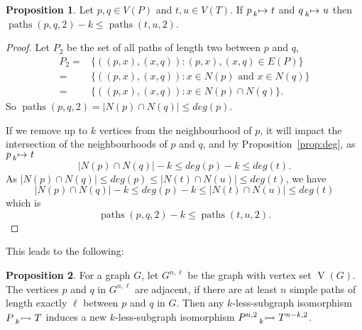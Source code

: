 \documentclass[letterpaper]{article}
\theoremstyle{definition}
\newtheorem{proposition}{Proposition}
\newcommand{\paths}{\operatorname{paths}}
\newcommand{\lessnonind}[1]{\prescript{}{#1}{\rightarrowtail}\ }
\newcommand{\lessmap}[1]{\prescript{}{#1}{\mapsto}\ }
\begin{document}
\begin{proposition}
    Let $p,q \in V(P)$ and $t,u\in V(T)$. If $p \lessmap{k} t$ and $q \lessmap{k} u$ then
     $\paths(p, q, 2) - k \le \paths(t, u, 2)$.
\end{proposition}
\begin{proof}
Let $P_{2}$ be the set of all paths of length two between $p$ and $q$,
\begin{align*}
P_{2} = & \{((p,x),(x,q)) : (p,x),(x,q)\in E(P) \} \\
 = & \{((p,x),(x,q)) : x\in N(p) \text{ and } x\in N(q) \} \\
 = & \{((p,x),(x,q)) : x\in N(p)\cap N(q) \} .
\end{align*}
So $\paths(p,q,2) = | N(p)\cap N(q)| \leq deg(p)$.

If we remove up to $k$ vertices from the neighbourhood of $p$, it will impact the intersection of the neighbourhoods of $p$ and $q$, and by Proposition~\ref{prop:deg}, as $p\lessmap{k}t$
\[
|N(p)\cap N(q)| - k \leq deg(p) - k \leq deg(t).
\]
As $|N(p)\cap N(q)|\leq deg(p) \leq |N(t)\cap N(u)|\leq deg(t)$, we have
\[
|N(p)\cap N(q)| - k \leq deg(p) - k\leq |N(t)\cap N(u)|\leq deg(t)
\]
which is
\[
\paths(p, q, 2) - k \leq \paths(t, u, 2).
\]
\end{proof}

This leads to the following:

\begin{proposition}
    For a graph $G$, let $G^{n, \ell}$ be the graph with vertex set $\operatorname{V}(G)$. The
    vertices $p$ and $q$ in $G^{n, \ell}$ are adjacent, if there are at least $n$ simple paths of
    length exactly $\ell$ between $p$ and $q$ in $G$. Then any $k$-less-subgraph isomorphism
    $P \lessnonind{k} T$ induces a new $k$-less-subgraph isomorphism
    $P^{n, 2}\lessnonind{k} T^{n - k, 2}$.
\end{proposition}
\end{document}

